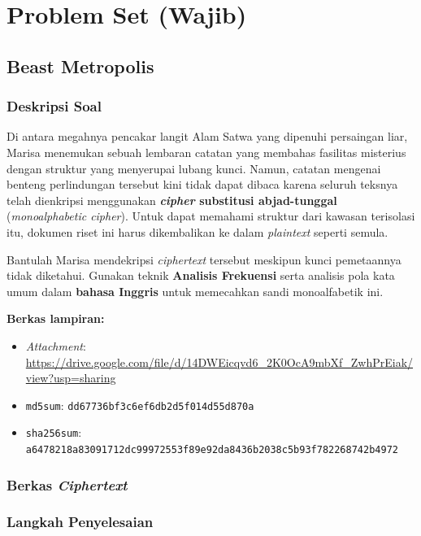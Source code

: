 \chapter{Problem Set (Wajib)}

\section{Beast Metropolis}

\subsection*{Deskripsi Soal}

Di antara megahnya pencakar langit Alam Satwa yang dipenuhi persaingan liar,
Marisa menemukan sebuah lembaran catatan yang membahas fasilitas misterius
dengan struktur yang menyerupai lubang kunci. Namun, catatan mengenai benteng
perlindungan tersebut kini tidak dapat dibaca karena seluruh teksnya telah
dienkripsi menggunakan \textbf{\textit{cipher} substitusi abjad-tunggal}
(\textit{monoalphabetic cipher}). Untuk dapat memahami struktur dari kawasan
terisolasi itu, dokumen riset ini harus dikembalikan ke dalam \textit{plaintext}
seperti semula.

Bantulah Marisa mendekripsi \textit{ciphertext} tersebut meskipun kunci
pemetaannya tidak diketahui. Gunakan teknik \textbf{Analisis Frekuensi} serta
analisis pola kata umum dalam \textbf{bahasa Inggris} untuk memecahkan sandi
monoalfabetik ini.

\medskip
\noindent\textbf{Berkas lampiran:}
\begin{itemize}[nosep]
  \item \textit{Attachment}: \url{https://drive.google.com/file/d/14DWEicqvd6_2K0OcA9mbXf_ZwhPrEiak/view?usp=sharing}
  \item \texttt{md5sum}: \texttt{dd67736bf3c6ef6db2d5f014d55d870a}
  \item \texttt{sha256sum}: \texttt{a6478218a83091712dc99972553f89e92da8436b2038c5b93f782268742b4972}
\end{itemize}

\subsection*{Berkas \textit{Ciphertext}}


\subsection*{Langkah Penyelesaian}

